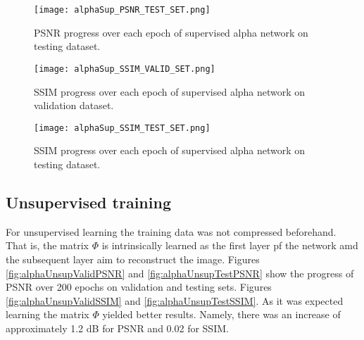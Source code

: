 \begin{figure}[tb] 
\centering 
\texttt{[image: alphaSup\_PSNR\_TEST\_SET.png]} 
\caption[PSNR testing progress during training of supervised alpha network]{PSNR progress over each epoch of supervised alpha network on testing dataset.}
\label{fig:alphaSupTestPSNR} 
\end{figure}  

\begin{figure}[tb] 
\centering 
\texttt{[image: alphaSup\_SSIM\_VALID\_SET.png]} 
\caption[SSIM validation progress during training of supervised alpha network]{SSIM progress over each epoch of supervised alpha network on validation dataset.}
\label{fig:alphaSupValidSSIM} 
\end{figure}  

\begin{figure}[tb] 
\centering 
\texttt{[image: alphaSup\_SSIM\_TEST\_SET.png]} 
\caption[SSIM testing progress during training of supervised alpha network]{SSIM progress over each epoch of supervised alpha network on testing dataset.}
\label{fig:alphaSupTestSSIM} 
\end{figure}  



\FloatBarrier

\subsection{Unsupervised training}
For unsupervised learning the training data was not compressed beforehand. That is, the matrix $\Phi$ is intrinsically learned as the first layer pf the network amd the subsequent layer aim to reconstruct the image. Figures \ref{fig:alphaUnsupValidPSNR} and \ref{fig:alphaUnsupTestPSNR} show the progress of PSNR over 200 epochs on validation and testing sets. Figures \ref{fig:alphaUnsupValidSSIM} and \ref{fig:alphaUnsupTestSSIM}. As it was expected learning the matrix $\Phi$ yielded better results. Namely, there was an increase of approximately 1.2 dB for PSNR and 0.02 for SSIM.    

